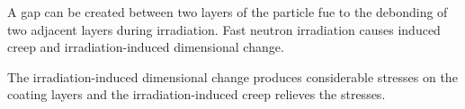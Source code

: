 A gap can be created between two layers of the particle fue to the debonding of two adjacent layers during irradiation.
Fast neutron irradiation causes induced creep and irradiation-induced dimensional change.

The irradiation-induced dimensional change produces considerable stresses on the coating layers and the irradiation-induced creep relieves the stresses.

\cite{cho_stress_2009}
